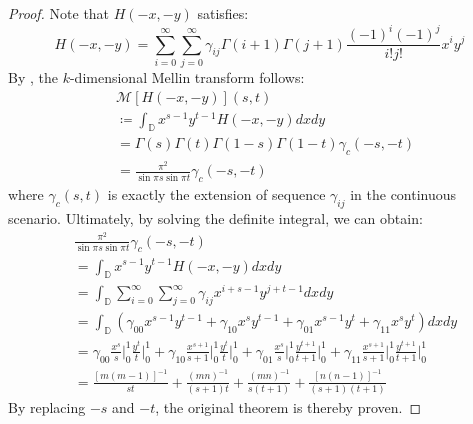 \documentclass{article}
\begin{document}
\begin{proof}
Note that $H(-x, -y)$ satisfies:
\begin{equation}
    H(-x, -y) = \sum_{i=0}^{\infty}\sum_{j=0}^{\infty}\gamma_{ij}\Gamma(i+1)\Gamma(j+1)\frac{(-1)^i(-1)^j}{i!j!}x^iy^j
\end{equation}
By , the $k$-dimensional Mellin transform follows:
\begin{equation}
    \begin{aligned}
        & \mathcal{M}[H(-x, -y)](s, t) \\
        & \coloneqq \int_{\mathbb{D}} x^{s-1}y^{t-1} H(-x, -y) dxdy \\
        & = \Gamma(s)\Gamma(t)\Gamma(1-s)\Gamma(1-t) \gamma_c(-s, -t)\\
        & = \frac{\pi^2}{\sin\pi s \sin\pi t} \gamma_c(-s, -t)
    \end{aligned}
\end{equation}
where $\gamma_c(s, t)$ is exactly the extension of sequence $\gamma_{ij}$ in the continuous scenario.
Ultimately, by solving the definite integral, we can obtain:
\begin{equation}
    \begin{aligned}
        & \frac{\pi^2}{\sin\pi s \sin\pi t}\gamma_c(-s, -t) \\
        & = \int_{\mathbb{D}} x^{s-1}y^{t-1} H(-x, -y) dxdy \\
        & = \int_{\mathbb{D}} \sum_{i=0}^{\infty}\sum_{j=0}^{\infty}\gamma_{ij}x^{i+s-1}y^{j+t-1} dxdy \\
        & = \int_{\mathbb{D}} (\gamma_{00}x^{s-1}y^{t-1} + \gamma_{10}x^{s}y^{t-1} + \gamma_{01}x^{s-1}y^{t} + \gamma_{11}x^sy^t) dxdy \\
        & = \gamma_{00}\frac{x^s}{s}\bigg|_0^1\frac{y^t}{t}\bigg|_0^1 + \gamma_{10}\frac{x^{s+1}}{s+1}\bigg|_0^1\frac{y^t}{t}\bigg|_0^1 + \gamma_{01}\frac{x^s}{s}\bigg|_0^1\frac{y^{t+1}}{t+1}\bigg|_0^1 + \gamma_{11}\frac{x^{s+1}}{s+1}\bigg|_0^1\frac{y^{t+1}}{t+1}\bigg|_0^1 \\
        & = \frac{[m(m-1)]^{-1}}{st}+\frac{(mn)^{-1}}{(s+1)t}+\frac{(mn)^{-1}}{s(t+1)}+\frac{[n(n-1)]^{-1}}{(s+1)(t+1)}
    \end{aligned}
\end{equation}
By replacing $-s$ and $-t$, the original theorem is thereby proven.
\end{proof}
\end{document}
